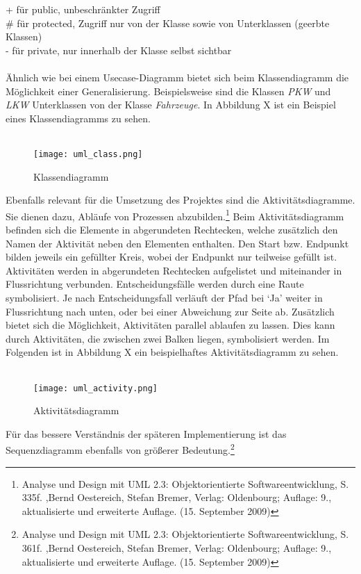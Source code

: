      + für public, unbeschränkter Zugriff\\
     \# für protected, Zugriff nur von der Klasse sowie von Unterklassen (geerbte Klassen)\\
     - für private, nur innerhalb der Klasse selbst sichtbar\\
\\
Ähnlich wie bei einem Usecase-Diagramm bietet sich beim Klassendiagramm die Möglichkeit einer Generalisierung.
Beispielsweise sind die Klassen \textit{PKW} und \textit{LKW} Unterklassen von der Klasse \textit{Fahrzeuge}. In Abbildung X ist ein Beispiel eines Klassendiagramms zu sehen.\\
\\
\begin{figure}[H]
\centering
\texttt{[image: uml\_class.png]}
\caption{Klassendiagramm}
\label{fig:show_s1_s2_p1_n1}
\end{figure}
Ebenfalls relevant für die Umsetzung des Projektes sind die Aktivitätsdiagramme.
Sie dienen dazu, Abläufe von Prozessen abzubilden.\footnote{Analyse und Design mit UML 2.3: Objektorientierte Softwareentwicklung, S. 335f. ,Bernd Oestereich, Stefan Bremer, Verlag: Oldenbourg; Auflage: 9., aktualisierte und erweiterte Auflage. (15. September 2009)}
Beim Aktivitätsdiagramm befinden sich die Elemente in abgerundeten Rechtecken, welche zusätzlich den Namen der Aktivität neben den Elementen enthalten.
Den Start bzw. Endpunkt bilden jeweils ein gefüllter Kreis, wobei der Endpunkt nur teilweise gefüllt ist. Aktivitäten werden in abgerundeten Rechtecken aufgelistet und miteinander in Flussrichtung verbunden. Entscheidungsfälle werden durch eine Raute symbolisiert.
Je nach Entscheidungsfall verläuft der Pfad bei ‘Ja’ weiter in Flussrichtung nach unten, oder bei einer Abweichung zur Seite ab.
Zusätzlich bietet sich die Möglichkeit, Aktivitäten parallel ablaufen zu lassen.
Dies kann durch Aktivitäten, die zwischen zwei Balken liegen, symbolisiert werden.
Im Folgenden ist in Abbildung X ein beispielhaftes Aktivitätsdiagramm zu sehen.\\
\\
\begin{figure}[H]
\centering
\texttt{[image: uml\_activity.png]}
\caption{Aktivitätsdiagramm}
\label{fig:show_s1_s2_p1_n1}
\end{figure}
Für das bessere Verständnis der späteren Implementierung ist das Sequenzdiagramm ebenfalls von größerer Bedeutung.\footnote{Analyse und Design mit UML 2.3: Objektorientierte Softwareentwicklung, S. 361f. ,Bernd Oestereich, Stefan Bremer, Verlag: Oldenbourg; Auflage: 9., aktualisierte und erweiterte Auflage. (15. September 2009)} 
